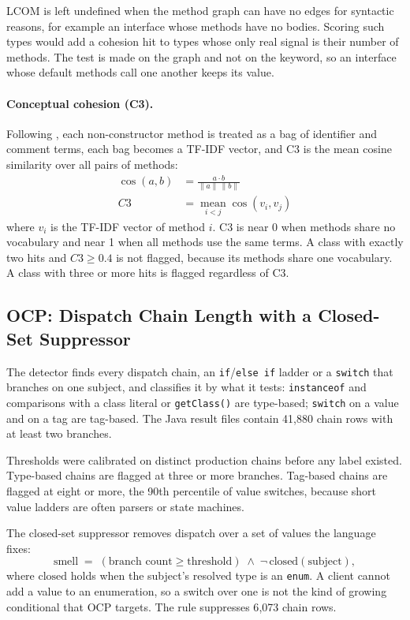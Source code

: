 LCOM is left undefined when the method graph can have no edges for syntactic reasons, for example
an interface whose methods have no bodies. Scoring such types would add a cohesion hit to types whose
only real signal is their number of methods. The test is made on the graph and not on the keyword,
so an interface whose default methods call one another keeps its value.

\paragraph{Conceptual cohesion (C3).} Following \citet{marcus2008c3}, each non-constructor method is
treated as a bag of identifier and comment terms, each bag becomes a TF-IDF vector, and C3 is the
mean cosine similarity over all pairs of methods:
\begin{align}
\cos(a,b) &= \frac{a \cdot b}{\lVert a \rVert \, \lVert b \rVert} \\
C3 &= \operatorname*{mean}_{i<j} \cos(v_i, v_j)
\end{align}
where $v_i$ is the TF-IDF vector of method $i$. C3 is near 0 when methods share no vocabulary and
near 1 when all methods use the same terms. A class with exactly two hits and $C3 \geq 0.4$ is not
flagged, because its methods share one vocabulary. A class with three or more hits is flagged
regardless of C3.

\subsection{OCP: Dispatch Chain Length with a Closed-Set Suppressor}

The detector finds every dispatch chain, an \texttt{if}/\texttt{else if} ladder or a \texttt{switch}
that branches on one subject, and classifies it by what it tests: \texttt{instanceof} and comparisons
with a class literal or \texttt{getClass()} are type-based; \texttt{switch} on a value and on a tag
are tag-based. The Java result files contain 41{,}880 chain rows with at least two branches.

Thresholds were calibrated on distinct production chains before any label existed. Type-based chains
are flagged at three or more branches. Tag-based chains are flagged at eight or more, the 90th
percentile of value switches, because short value ladders are often parsers or state machines.

The closed-set suppressor removes dispatch over a set of values the language fixes:
\[
\text{smell} \;=\; (\text{branch count} \geq \text{threshold}) \; \wedge \; \lnot\,
\text{closed}(\text{subject}),
\]
where $\text{closed}$ holds when the subject's resolved type is an \texttt{enum}. A client cannot add
a value to an enumeration, so a switch over one is not the kind of growing conditional that OCP
targets. The rule suppresses 6{,}073 chain rows.

